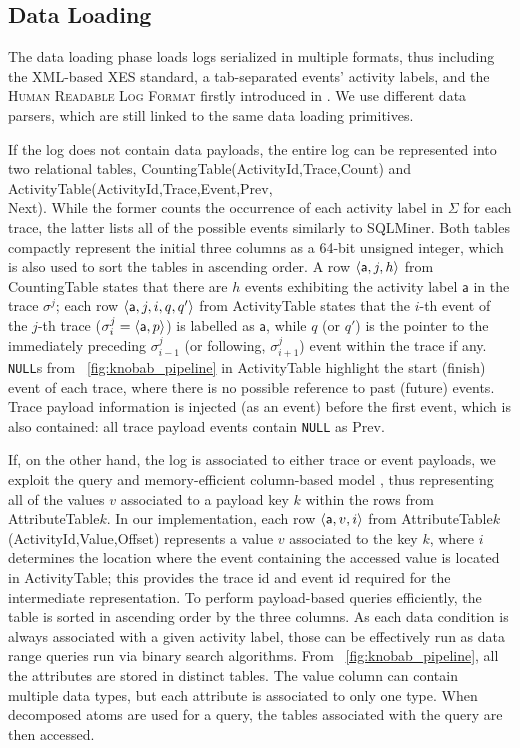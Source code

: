 \subsection{Data Loading}\label{ssec:dl}
The data loading phase   loads logs  serialized in multiple  formats, thus including the XML-based XES standard, a tab-separated events' activity labels, and the \textsc{Human Readable Log Format} firstly introduced in \cite{bpm21}. We use different data parsers, which are still linked to the same data loading primitives. 

If the log does not contain data payloads, the entire log can be represented into two relational tables, \textsf{CountingTable(ActivityId,Trace,Count)} and \textsf{ActivityTable(ActivityId,Trace,Event,Prev,\\Next)}. While the former counts the occurrence of each activity label in $\Sigma$ for each trace, the latter lists all of the possible events similarly to SQLMiner. Both tables compactly represent the initial three columns as a 64-bit unsigned integer, which is also used to sort the tables in ascending order. A row $\braket{\textsf{a},j,h}$ from \textsf{CountingTable} states that there are $h$ events exhibiting the activity label $\textsf{a}$ in the trace $\sigma^j$; each row $\braket{\textsf{a},j,i,q,q'}$ from \textsf{ActivityTable} states that the $i$-th event of the $j$-th trace ($\sigma^j_i=\braket{\textsf{a},p}$) is labelled as $\textsf{a}$, while $q$ (or $q'$) is the pointer to the immediately preceding $\sigma^j_{i-1}$ (or  following, $\sigma^j_{i+1}$) event within the trace if any. \texttt{NULL}s from  \figurename~\ref{fig:knobab_pipeline} in \textsf{ActivityTable} highlight the start (finish) event of each trace, where there is no possible reference to past (future) events. Trace payload information is injected (as an event) before the first event, which is also contained:  all trace payload events contain \texttt{NULL} as \textsf{Prev}. %


If, on the other hand, the log is associated to either trace or event payloads, we exploit 
the query and memory-efficient  column-based model \cite{IdreosGNMMK12}, thus representing all of the values $v$ associated to a  payload key $k$ within the rows from  \textsf{AttributeTable$k$}. In our implementation, each row $\braket{\textsf{a},v,i}$ from  \textsf{AttributeTable$k$(ActivityId,Value,Offset)} represents a value $v$ associated to the key $k$, where $i$ determines the location where the event containing the accessed value is located in \textsf{ActivityTable}; this %
provides the trace id and event id required for the intermediate representation.
 To perform payload-based queries efficiently, the table is sorted in ascending order by the  three columns. As each data condition is always associated with a given activity label, those can be effectively run as data range queries run via binary search algorithms. From \figurename~\ref{fig:knobab_pipeline}, all the attributes are stored in distinct tables. The value column can contain multiple data types, but each attribute is associated to only one type. When decomposed atoms are used for a query, the tables associated with the query are then accessed. %

